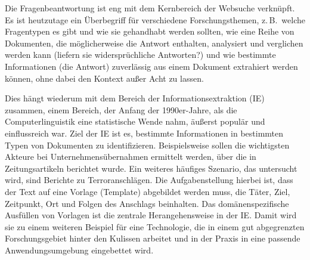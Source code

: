 \begin{multicols}{2}
Die Fragenbeantwortung ist eng mit dem Kernbereich der Websuche verknüpft. Es ist heutzutage ein Überbegriff für verschiedene Forschungsthemen, z.\,B.~welche Fragentypen es gibt und wie sie gehandhabt werden sollten, wie eine Reihe von Dokumenten, die möglicherweise die Antwort enthalten, analysiert und verglichen werden kann (liefern sie widersprüchliche Antworten?) und wie bestimmte Informationen (die Antwort) zuverlässig aus einem Dokument extrahiert werden können, ohne dabei den Kontext außer Acht zu lassen.


Dies hängt wiederum mit dem Bereich der Informationsextraktion (IE) zusammen, einem Bereich, der Anfang der 1990er-Jahre, als die Computerlinguistik eine statistische Wende nahm, äußerst populär und einflussreich war. Ziel der IE ist es, bestimmte Informationen in bestimmten Typen von Dokumenten zu identifizieren. Beispielsweise sollen die wichtigsten Akteure bei Unternehmensübernahmen ermittelt werden, über die in Zeitungsartikeln berichtet wurde. Ein weiteres häufiges Szenario, das untersucht wird, sind Berichte zu Terroranschlägen. Die Aufgabenstellung hierbei ist, dass der Text auf eine Vorlage (Template) abgebildet werden muss, die 
Täter, Ziel, Zeitpunkt, Ort und Folgen des Anschlags beinhalten. 
Das domänenspezifische Ausfüllen von Vorlagen ist die zentrale Herangehensweise in der IE. Damit wird sie zu einem weiteren Beispiel für eine Technologie, die in einem gut abgegrenzten Forschungsgebiet hinter den Kulissen arbeitet und
in der Praxis in eine passende Anwendungsumgebung eingebettet wird.


\end{multicols}
